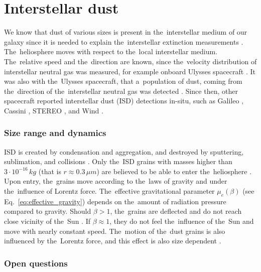 \section{Interstellar dust}

We know that dust of various sizes is present in the~interstellar medium of our galaxy since it is needed to explain the~interstellar extinction measurements \citep{desert1990interstellar}. The~heliosphere moves with respect to the~local interstellar medium. The~relative speed and the~direction are known, since the~velocity distribution of interstellar neutral gas was measured, for example onboard Ulysses spacecraft \citep{witte2004kinetic}. It was also with the~Ulysses spacecraft, that a~population of dust, coming from the~direction of the~interstellar neutral gas was detected \citep{grun1993discovery}. Since then, other spacecraft reported interstellar dust ({ISD}) detections in-situ, such as Galileo \citep{baguhl1995flux}, Cassini \citep{altobelli2003cassini}, STEREO \citep{zaslavsky2012interplanetary}, and Wind \citep{malaspina2014interplanetary}. 

\subsubsection{Size range and dynamics}

ISD is created by condensation and aggregation, and destroyed by sputtering, sublimation, and collisions \citep{mann2010interstellar}. Only the~ISD grains with masses higher than $3\cdot 10^{-16} \, \si{kg}$ (that is $r \approx 0.3 \, \si{\mu m} $) are believed to be able to enter the~heliosphere \citep{kimura1998electric}. Upon entry, the~grains move according to the~laws of gravity and under the~influence of Lorentz force. The~effective gravitational parameter $\mu_e(\beta)$ (see Eq.~\ref{eq:effective_gravity}) depends on the~amount of radiation pressure compared to gravity. Should $\beta > 1$, the~grains are deflected and do not reach close vicinity of the~Sun \citep{henriksen2022interstellar}. If $\beta \approx 1$, they do not feel the~influence of the~Sun and move with nearly constant speed. The~motion of the~dust grains is also influenced by the~Lorentz force, and this effect is also size dependent \citep{morfill1979motion}.

\subsubsection{Open questions}

